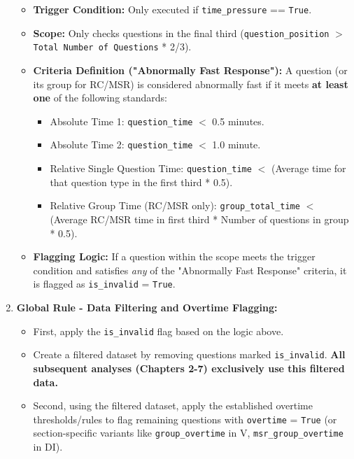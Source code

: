 \documentclass{article}
\begin{document}
\begin{enumerate}
        \begin{itemize}
            \item \textbf{Trigger Condition:} Only executed if \texttt{time\_pressure} == \texttt{True}.
            \item \textbf{Scope:} Only checks questions in the final third (\texttt{question\_position} $>$ \texttt{Total Number of Questions} * 2/3). %
            \item \textbf{Criteria Definition ("Abnormally Fast Response"):} A question (or its group for RC/MSR) is considered abnormally fast if it meets \textbf{at least one} of the following standards:
                \begin{itemize}
                    \item Absolute Time 1: \texttt{question\_time} $<$ 0.5 minutes. %
                    \item Absolute Time 2: \texttt{question\_time} $<$ 1.0 minute. %
                    \item Relative Single Question Time: \texttt{question\_time} $<$ (Average time for that question type in the first third * 0.5). %
                    \item Relative Group Time (RC/MSR only): \texttt{group\_total\_time} $<$ (Average RC/MSR time in first third * Number of questions in group * 0.5). %
                \end{itemize}
            \item \textbf{Flagging Logic:} If a question within the scope meets the trigger condition and satisfies \textit{any} of the "Abnormally Fast Response" criteria, it is flagged as \texttt{is\_invalid} = \texttt{True}.
        \end{itemize}
    \item \textbf{Global Rule - Data Filtering and Overtime Flagging:}
    \begin{itemize}
        \item First, apply the \texttt{is\_invalid} flag based on the logic above.
        \item Create a filtered dataset by removing questions marked \texttt{is\_invalid}. \textbf{All subsequent analyses (Chapters 2-7) exclusively use this filtered data.}
        \item Second, using the filtered dataset, apply the established overtime thresholds/rules to flag remaining questions with \texttt{overtime} = \texttt{True} (or section-specific variants like \texttt{group\_overtime} in V, \texttt{msr\_group\_overtime} in DI).
    \end{itemize}
\end{enumerate}
\end{document}
